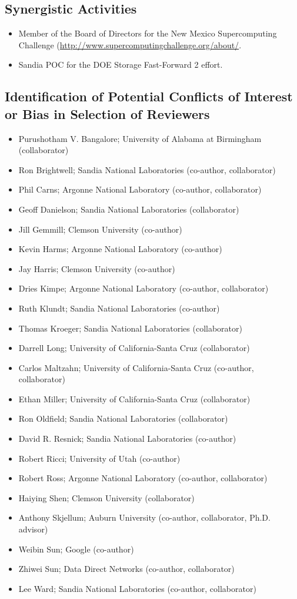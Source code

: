 \documentclass[11pt]{article}
\begin{document}
\subsection{Synergistic Activities}
\begin{itemize}
\item Member of the Board of Directors for the New Mexico Supercomputing Challenge (\url{http://www.supercomputingchallenge.org/about/}.
\item Sandia POC for the DOE Storage Fast-Forward 2 effort.
\end{itemize}
\subsection{Identification of Potential Conflicts of Interest or Bias in Selection of Reviewers}
\begin{itemize}
\item Purushotham V. Bangalore; University of Alabama at Birmingham (collaborator)
\item Ron Brightwell; Sandia National Laboratories (co-author, collaborator)
\item Phil Carns; Argonne National Laboratory (co-author, collaborator)
\item Geoff Danielson; Sandia National Laboratories (collaborator)
\item Jill Gemmill; Clemson University (co-author)
\item Kevin Harms; Argonne National Laboratory (co-author)
\item Jay Harris; Clemson University (co-author)
\item Dries Kimpe; Argonne National Laboratory (co-author, collaborator)
\item Ruth Klundt; Sandia National Laboratories (co-author)
\item Thomas Kroeger; Sandia National Laboratories (collaborator)
\item Darrell Long; University of California-Santa Cruz (collaborator)
\item Carlos Maltzahn; University of California-Santa Cruz (co-author, collaborator)
\item Ethan Miller; University of California-Santa Cruz (collaborator)
\item Ron Oldfield; Sandia National Laboratories (collaborator)
\item David R. Resnick; Sandia National Laboratories (co-author)
\item Robert Ricci; University of Utah (co-author)
\item Robert Ross; Argonne National Laboratory (co-author, collaborator)
\item Haiying Shen; Clemson University (collaborator)
\item Anthony Skjellum; Auburn University (co-author, collaborator, Ph.D. advisor)
\item Weibin Sun; Google (co-author)
\item Zhiwei Sun; Data Direct Networks (co-author, collaborator)
\item Lee Ward; Sandia National Laboratories (co-author, collaborator)
\end{itemize}
\end{document}
